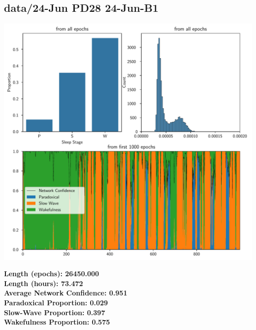         \subsection*{ data/24-Jun PD28 24-Jun-B1 }
        \begin{center}
        \begin{adjustbox}{width=1\textwidth}
        \includegraphics[page=12]{figs.pdf}
        \end{adjustbox}
        \end{center}
        \large\textbf{Length (epochs): 26450.000}\\
        \textbf{Length (hours): 73.472}\\
        \textbf{Average Network Confidence: 0.951}\\
        \textbf{Paradoxical Proportion: 0.029}\\
        \textbf{Slow-Wave Proportion: 0.397}\\
        \textbf{Wakefulness Proportion: 0.575}\\
        
